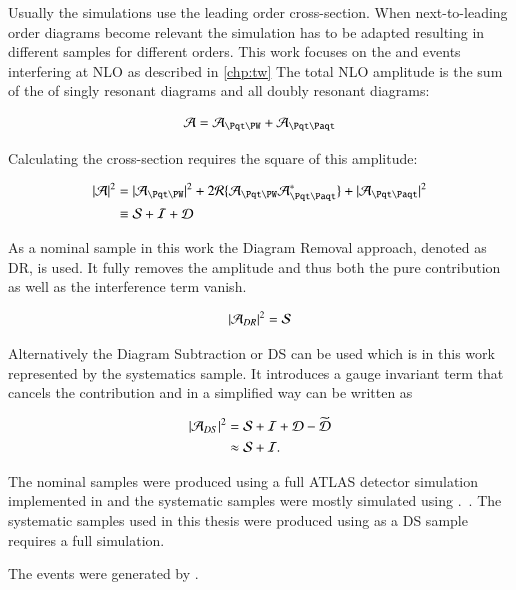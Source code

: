 Usually the simulations use the leading order cross-section.
When next-to-leading order diagrams become relevant the simulation has to be adapted resulting in different samples for different orders.
This work focuses on the \tW and \ttbar events interfering at NLO as described in \ref{chp:tw}
The total NLO amplitude is the sum of the of singly resonant diagrams and all doubly resonant diagrams:

\begin{align}
\Aamp = \Atw + \Att
\end{align}

Calculating the cross-section requires the square of this amplitude:

\begin{align}
|\Aamp|^2 &= |\Atw|^2 + 2 \mathcal{R} \{ \Atw \Att^{\ast} \} + |\Att|^2 \\
&\equiv \Samp + \Iamp + \Damp
\end{align}

As a nominal sample in this work the Diagram Removal approach, denoted as DR, is used. It fully removes the \Att amplitude and thus both the pure \ttbar contribution as well as the interference term vanish.

\begin{align}
| \mathcal{A}_{DR} |^2 = \mathcal{S}
\end{align}

Alternatively the Diagram Subtraction or DS can be used which is in this work represented by the systematics sample. It introduces a gauge invariant term that cancels the \ttbar contribution and in a simplified way can be written as

\begin{align}
| \mathcal{A}_{DS} |^2 &= \mathcal{S} + \mathcal{I} + \mathcal{D} - \widetilde{\mathcal{D}}\\
&\approx \mathcal{S} + \mathcal{I}.
\end{align}

The nominal samples were produced using a full ATLAS detector simulation implemented in \GEANTfour and the systematic samples were mostly simulated using \ATLFASTtwo.~\cite{geant, atlfast}. The systematic samples used in this thesis were produced using \GEANTfour as a DS sample requires a full simulation.

The events were generated by \POWHEG{}.~\cite{pythia}



